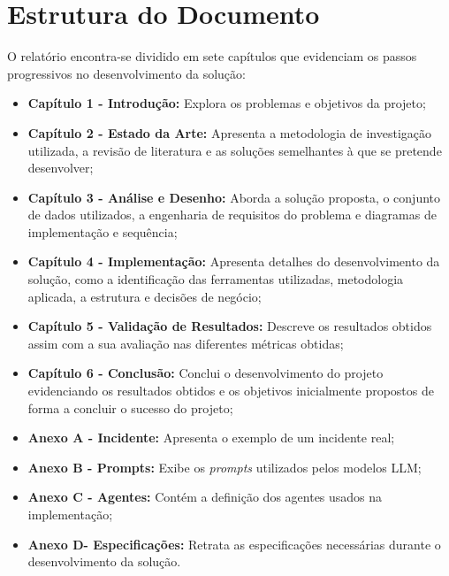 \section{Estrutura do Documento}
	O relatório encontra-se dividido em sete capítulos que evidenciam os passos progressivos no desenvolvimento da solução:
	\begin{itemize}
		\item \textbf{Capítulo 1 - Introdução: }Explora os problemas e objetivos da projeto;
		\item \textbf{Capítulo 2 - Estado da Arte:} Apresenta a metodologia de investigação utilizada, a revisão de literatura e as soluções semelhantes à que se pretende desenvolver;
		\item \textbf{Capítulo 3 - Análise e Desenho:} Aborda a solução proposta, o conjunto de dados utilizados, a engenharia de requisitos do problema e diagramas de implementação e sequência;
		\item \textbf{Capítulo 4 - Implementação:} Apresenta detalhes do desenvolvimento da solução, como a identificação das ferramentas utilizadas, metodologia aplicada, a estrutura e decisões de negócio;
		\item \textbf{Capítulo 5 - Validação de Resultados:} Descreve os resultados obtidos assim com a sua avaliação nas diferentes métricas obtidas;
		\item \textbf{Capítulo 6 - Conclusão:} Conclui o desenvolvimento do projeto evidenciando os resultados obtidos e os objetivos inicialmente propostos de forma a concluir o sucesso do projeto;
		\item \textbf{Anexo A - Incidente:} Apresenta o exemplo de um incidente real;
		\item \textbf{Anexo B - Prompts:} Exibe os \textit{prompts} utilizados pelos modelos \gls{LLM};
		\item \textbf{Anexo C - Agentes:} Contém a definição dos agentes usados na implementação;
		\item \textbf{Anexo D- Especificações:} Retrata as especificações necessárias durante o desenvolvimento da solução.
	\end{itemize}

